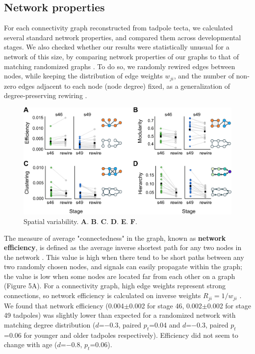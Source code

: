 \documentclass{article}
\begin{document}
\subsection*{Network properties}

For each connectivity graph reconstructed from tadpole tecta, we calculated several standard network properties, and compared them across developmental stages. We also checked whether our results were statistically unusual for a network of this size, by comparing network properties of our graphs to that of matching randomized graphs \citep{ansmann2012surrogate}. To do so, we randomly rewired edges between nodes, while keeping the distribution of edge weights $w_{ji}$, and the number of non-zero edges adjacent to each node (node degree) fixed, as a generalization of degree-preserving rewiring \citep{maslov2002}. 

\begin{figure}[t]
\includegraphics[width=\linewidth]{fig5.pdf}
\caption{
Spatial variability. \textbf{A}. \textbf{B}. \textbf{C}. \textbf{D}. \textbf{E}. \textbf{F}. }
\end{figure}

The measure of average "connectedness" in the graph, known as \textbf{network efficiency}, is defined as the average inverse shortest path for any two nodes in the network \citep{latora2001efficiency}. This value is high when there tend to be short paths between any two randomly chosen nodes, and signals can easily propagate within the graph; the value is low when some nodes are located far from each other on a graph (Figure 5A). For a connectivity graph, high edge weights represent strong connections, so network efficiency is calculated on inverse weights $R_{ji} = 1/w_{ji}$ \citep{rubinov2010toolbox}. We found that network efficiency (0.004$\pm$0.002 for stage 46, 0.002$\pm$0.002 for stage 49 tadpoles) was slightly lower than expected for a randomized network with matching degree distribution ($d$=$-$0.3, paired $p_t$=0.04 and $d$=$-$0.3, paired $p_t$=0.06 for younger and older tadpoles respectively). Efficiency did not seem to change with age ($d$=$-$0.8, $p_t$=0.06).
\end{document}
